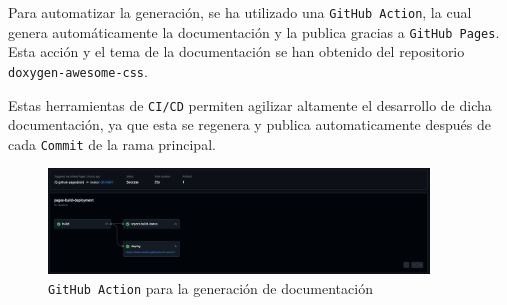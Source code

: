 Para automatizar la generación, se ha utilizado una \texttt{GitHub Action}, la cual genera automáticamente la documentación y la publica gracias a \texttt{GitHub Pages}. Esta acción y el tema de la documentación se han obtenido del repositorio \texttt{doxygen-awesome-css}. \cite{jotheproJotheproDoxygenawesomecss2024} 

Estas herramientas de \texttt{CI/CD} permiten agilizar altamente el desarrollo de dicha documentación, ya que esta se regenera y publica automaticamente después de cada \texttt{Commit} de la rama principal.

\begin{figure}[H]
    \centering
    \includegraphics[width=0.9\textwidth]{images/3-software/3-5-doxygen/githubAction.png}
    \caption{\texttt{GitHub Action} para la generación de documentación}
\end{figure}